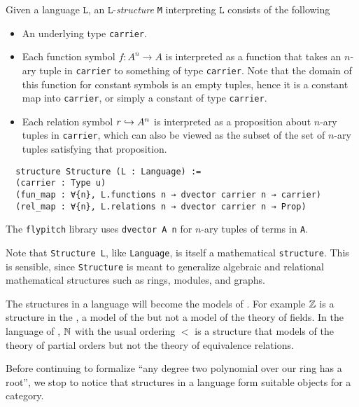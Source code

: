 \begin{dfn}[Structures]
    Given a language $\texttt{L}$, an $\texttt{L}$-\textit{structure} \texttt{M}
    interpreting $\texttt{L}$ consists of the following
    \begin{itemize}
      \item An underlying type \texttt{carrier}.
      \item Each function symbol $f : A^{n} \to A$ is interpreted as a
            function that takes an $n$-ary tuple in \texttt{carrier}
            to something of type \texttt{carrier}.
            Note that the domain of this function for constant symbols is an empty tuples,
            hence it is a constant map into \texttt{carrier},
            or simply a constant of type \texttt{carrier}.
      \item Each relation symbol $r \hookrightarrow A^{n}$
            is interpreted as a proposition about $n$-ary tuples in \texttt{carrier},
            which can also be viewed as the subset of the set of $n$-ary tuples
            satisfying that proposition.
    \end{itemize}

  \begin{lstlisting}
  structure Structure (L : Language) :=
  (carrier : Type u)
  (fun_map : ∀{n}, L.functions n → dvector carrier n → carrier)
  (rel_map : ∀{n}, L.relations n → dvector carrier n → Prop)\end{lstlisting}

  The \texttt{flypitch} library uses \texttt{dvector A n} for $n$-ary tuples of terms in \texttt{A}.

  Note that \texttt{Structure L}, like \texttt{Language},
  is itself a mathematical \texttt{structure}.
  This is sensible, since \texttt{Structure} is meant to generalize algebraic
  and relational mathematical structures such as rings, modules, and graphs.
\end{dfn}

The structures in a language will become the models of .
For example $\mathbb{Z}$ is a structure in the ,
a model of the  but not a model of the theory of fields.
In the language of ,
$\mathbb{N}$ with the usual ordering $<$ is a structure that models of
the theory of partial orders but not the theory of equivalence relations.

Before continuing to formalize ``any degree two polynomial over our ring has a root'',
we stop to notice that structures in a language form suitable objects for a category.

